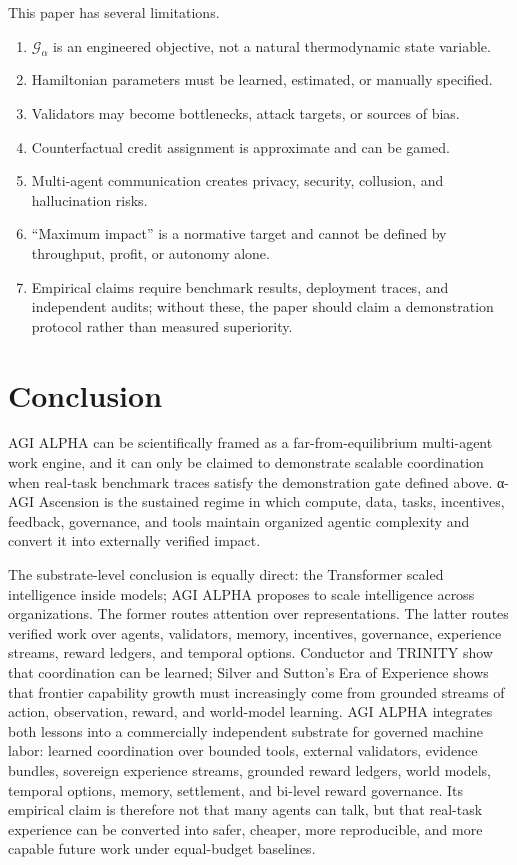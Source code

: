 \documentclass[11pt]{article}
\providecommand{\tightlist}{\setlength{\itemsep}{0pt}\setlength{\parskip}{0pt}}
\begin{document}
This paper has several limitations.

\begin{enumerate}
\def\labelenumi{\arabic{enumi}.}
\tightlist
\item
  \(\mathcal{G}_{\alpha}\) is an engineered objective, not a natural
  thermodynamic state variable.
\item
  Hamiltonian parameters must be learned, estimated, or manually
  specified.
\item
  Validators may become bottlenecks, attack targets, or sources of bias.
\item
  Counterfactual credit assignment is approximate and can be gamed.
\item
  Multi-agent communication creates privacy, security, collusion, and
  hallucination risks.
\item
  ``Maximum impact'' is a normative target and cannot be defined by
  throughput, profit, or autonomy alone.
\item
  Empirical claims require benchmark results, deployment traces, and
  independent audits; without these, the paper should claim a
  demonstration protocol rather than measured superiority.
\end{enumerate}

\section{Conclusion}\label{conclusion}

AGI ALPHA can be scientifically framed as a far-from-equilibrium
multi-agent work engine, and it can only be claimed to demonstrate
scalable coordination when real-task benchmark traces satisfy the
demonstration gate defined above. α-AGI Ascension is the sustained
regime in which compute, data, tasks, incentives, feedback, governance,
and tools maintain organized agentic complexity and convert it into
externally verified impact.

The substrate-level conclusion is equally direct: the Transformer scaled
intelligence inside models; AGI ALPHA proposes to scale intelligence
across organizations. The former routes attention over representations.
The latter routes verified work over agents, validators, memory,
incentives, governance, experience streams, reward ledgers, and temporal
options. Conductor and TRINITY show that coordination can be learned;
Silver and Sutton's Era of Experience shows that frontier capability growth must
increasingly come from grounded streams of action, observation, reward,
and world-model learning. AGI ALPHA integrates both lessons into a
commercially independent substrate for governed machine labor: learned
coordination over bounded tools, external validators, evidence bundles,
sovereign experience streams, grounded reward ledgers, world models, temporal options, memory, settlement, and bi-level reward governance. Its empirical claim is therefore not that many agents can talk, but that real-task experience can be converted into safer, cheaper, more reproducible, and more capable future work under equal-budget baselines.
\end{document}
